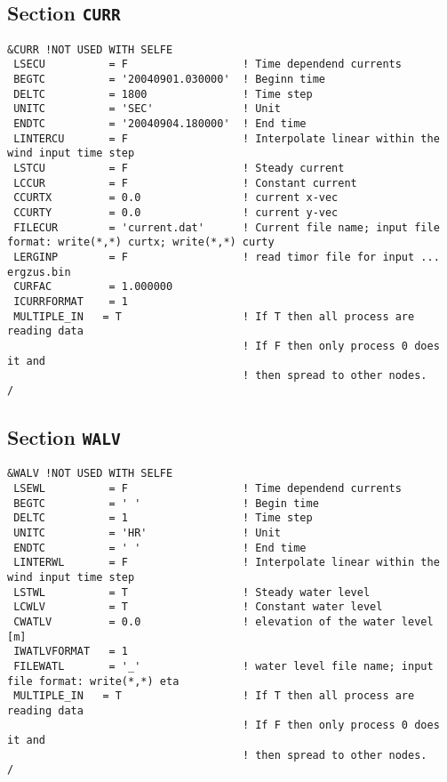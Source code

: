 \documentclass[12pt]{amsart}
\begin{document}
\subsection{Section {\tt CURR}}
\begin{verbatim}
&CURR !NOT USED WITH SELFE
 LSECU          = F                  ! Time dependend currents
 BEGTC          = '20040901.030000'  ! Beginn time
 DELTC          = 1800               ! Time step
 UNITC          = 'SEC'              ! Unit
 ENDTC          = '20040904.180000'  ! End time
 LINTERCU       = F                  ! Interpolate linear within the wind input time step
 LSTCU          = F                  ! Steady current
 LCCUR          = F                  ! Constant current
 CCURTX         = 0.0                ! current x-vec
 CCURTY         = 0.0                ! current y-vec
 FILECUR        = 'current.dat'      ! Current file name; input file format: write(*,*) curtx; write(*,*) curty
 LERGINP        = F                  ! read timor file for input ... ergzus.bin
 CURFAC         = 1.000000
 ICURRFORMAT    = 1
 MULTIPLE_IN   = T                   ! If T then all process are reading data
                                     ! If F then only process 0 does it and
                                     ! then spread to other nodes.
/
\end{verbatim}




\subsection{Section {\tt WALV}}
\begin{verbatim}
&WALV !NOT USED WITH SELFE
 LSEWL          = F                  ! Time dependend currents
 BEGTC          = ' '                ! Begin time
 DELTC          = 1                  ! Time step
 UNITC          = 'HR'               ! Unit
 ENDTC          = ' '                ! End time
 LINTERWL       = F                  ! Interpolate linear within the wind input time step
 LSTWL          = T                  ! Steady water level
 LCWLV          = T                  ! Constant water level
 CWATLV         = 0.0                ! elevation of the water level [m]
 IWATLVFORMAT   = 1
 FILEWATL       = '_'                ! water level file name; input file format: write(*,*) eta
 MULTIPLE_IN   = T                   ! If T then all process are reading data
                                     ! If F then only process 0 does it and
                                     ! then spread to other nodes.
/
\end{verbatim}
\end{document}
